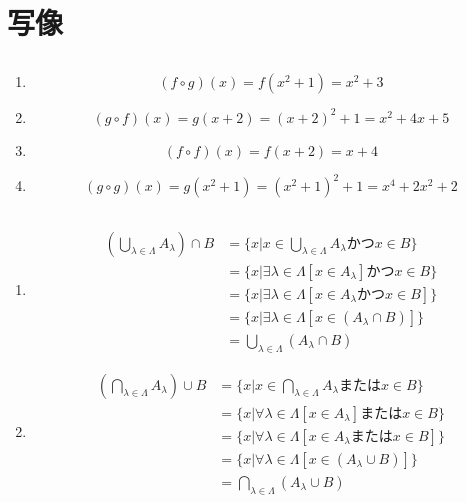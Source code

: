 \documentclass{jsarticle}
\begin{document}
\section{写像}
\subsection{}
\begin{enumerate}
\item
\[(f\circ g)(x)=f(x^2+1)=x^2+3\]
\item
\[(g\circ f)(x)=g(x+2)=(x+2)^2+1=x^2+4x+5\]
\item
\[(f\circ f)(x)=f(x+2)=x+4\]
\item
\[(g\circ g)(x)=g(x^2+1)=(x^2+1)^2+1=x^4+2x^2+2\]
\end{enumerate}

\subsection{}
\begin{enumerate}
\item
\begin{align*}
(\bigcup_{\lambda\in\Lambda}A_\lambda)\cap B&=\{x| x\in\bigcup_{\lambda\in\Lambda}A_\lambda かつ x\in B\}\\
&=\{x|\exists \lambda\in\Lambda[x\in A_{\lambda}]かつx\in B\}\\
&=\{x|\exists \lambda\in\Lambda[x\in A_{\lambda} かつ x\in B]\}\\
&=\{x|\exists \lambda\in\Lambda[x\in (A_{\lambda} \cap B)]\}\\
&=\bigcup_{\lambda\in\Lambda}(A_{\lambda}\cap B)
\end{align*}

\item
\begin{align*}
(\bigcap_{\lambda\in\Lambda}A_\lambda)\cup B&=\{x| x\in\bigcap_{\lambda\in\Lambda}A_\lambda または x\in B\}\\
&=\{x|\forall \lambda\in\Lambda[x\in A_{\lambda}]またはx\in B\}\\
&=\{x|\forall \lambda\in\Lambda[x\in A_{\lambda} または x\in B]\}\\
&=\{x|\forall \lambda\in\Lambda[x\in (A_{\lambda} \cup B)]\}\\
&=\bigcap_{\lambda\in\Lambda}(A_{\lambda}\cup B)
\end{align*}
\end{enumerate}
\end{document}
